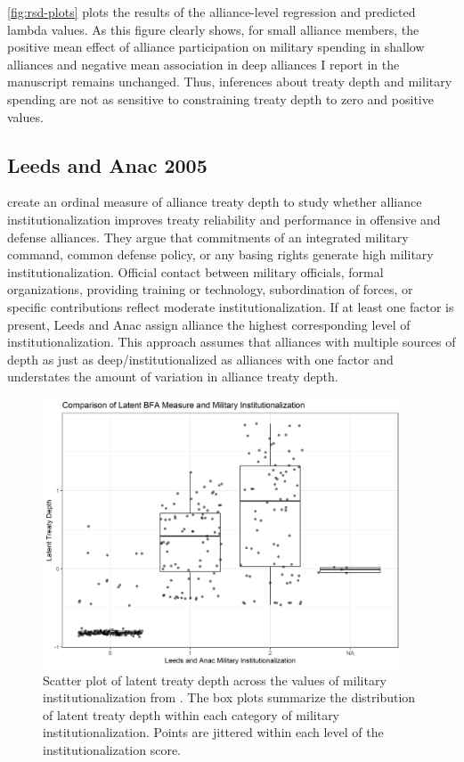 \documentclass[12pt]{article}
\begin{document}
\autoref{fig:rsd-plots} plots the results of the alliance-level regression and predicted lambda values. 
As this figure clearly shows, for small alliance members, the positive mean effect of alliance participation on military spending in shallow alliances and negative mean association in deep alliances I report in the manuscript remains unchanged. 
Thus, inferences about treaty depth and military spending are not as sensitive to constraining treaty depth to zero and positive values. 



\subsection{Leeds and Anac 2005}


\citet{LeedsAnac2005} create an ordinal measure of alliance treaty depth to study whether alliance institutionalization improves treaty reliability and performance in offensive and defense alliances. 
They argue that commitments of an integrated military command, common defense policy, or any basing rights generate high military institutionalization. 
Official contact between military officials, formal organizations, providing training or technology, subordination of forces, or specific contributions reflect moderate institutionalization. 
If at least one factor is present, Leeds and Anac assign alliance the highest corresponding level of institutionalization. 
This approach assumes that alliances with multiple sources of depth as just as deep/institutionalized as alliances with one factor and understates the amount of variation in alliance treaty depth. 


\begin{figure}[htbp]
	\centering
		\includegraphics[width=0.95\textwidth]{leeds-anac-comp.png}
	\caption{Scatter plot of latent treaty depth across the values of military institutionalization from \citet{LeedsAnac2005}. The box plots summarize the distribution of latent treaty depth within each category of military institutionalization. Points are jittered within each level of the institutionalization score.}
	\label{fig:leeds-anac-comp}
\end{figure}
\end{document}
